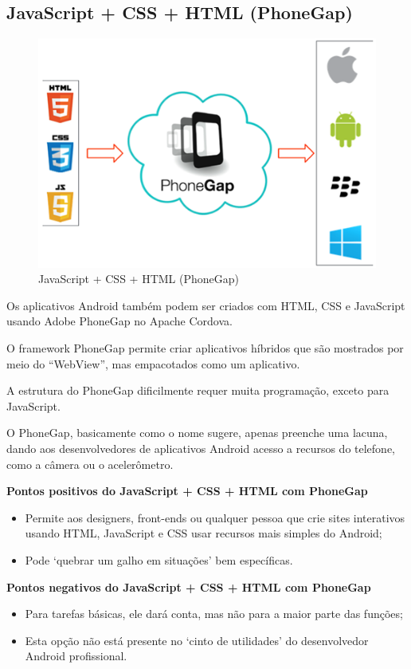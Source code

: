 \subsection{JavaScript + CSS + HTML (PhoneGap)}

\begin{figure}[H]
    \centering
    \includegraphics[width=0.3\linewidth]{dados/figuras/phonegap}
    \caption{JavaScript + CSS + HTML (PhoneGap)}
    \label{fig:phonegap}
\end{figure}

Os aplicativos Android também podem ser criados com HTML, CSS e JavaScript usando Adobe PhoneGap no Apache Cordova.

O framework PhoneGap permite criar aplicativos híbridos que são mostrados por meio do “WebView”, mas empacotados como um aplicativo.

A estrutura do PhoneGap dificilmente requer muita programação, exceto para JavaScript.

O PhoneGap, basicamente como o nome sugere, apenas preenche uma lacuna, dando aos desenvolvedores de aplicativos Android acesso a recursos do telefone, como a câmera ou o acelerômetro.

\textbf{Pontos positivos do JavaScript + CSS + HTML com PhoneGap}

\begin{itemize}
    \item Permite aos designers, front-ends ou qualquer pessoa que crie sites interativos usando HTML, JavaScript e CSS usar recursos mais simples do Android;
    \item Pode ‘quebrar um galho em situações’ bem específicas.
\end{itemize}

\textbf{Pontos negativos do JavaScript + CSS + HTML com PhoneGap}

\begin{itemize}
    \item Para tarefas básicas, ele dará conta, mas não para a maior parte das funções;
    \item Esta opção não está presente no ‘cinto de utilidades’ do desenvolvedor Android profissional.
\end{itemize}


